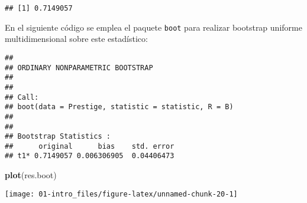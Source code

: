 \documentclass[]{book}
\newenvironment{Shaded}{\begin{snugshade}}{\end{snugshade}}
\newcommand{\KeywordTok}[1]{\textcolor[rgb]{0.13,0.29,0.53}{\textbf{#1}}}
\newcommand{\DataTypeTok}[1]{\textcolor[rgb]{0.13,0.29,0.53}{#1}}
\newcommand{\DecValTok}[1]{\textcolor[rgb]{0.00,0.00,0.81}{#1}}
\newcommand{\StringTok}[1]{\textcolor[rgb]{0.31,0.60,0.02}{#1}}
\newcommand{\CommentTok}[1]{\textcolor[rgb]{0.56,0.35,0.01}{\textit{#1}}}
\newcommand{\ControlFlowTok}[1]{\textcolor[rgb]{0.13,0.29,0.53}{\textbf{#1}}}
\newcommand{\OperatorTok}[1]{\textcolor[rgb]{0.81,0.36,0.00}{\textbf{#1}}}
\newcommand{\NormalTok}[1]{#1}
\theoremstyle{break}
\theoremstyle{definition}
\theoremstyle{definition}
\theoremstyle{definition}
\theoremstyle{remark}
\begin{document}
\begin{Shaded}
\end{Shaded}

\begin{verbatim}
## [1] 0.7149057
\end{verbatim}

En el siguiente código se emplea el paquete \texttt{boot} para realizar
bootstrap uniforme multidimensional sobre este estadístico:

\begin{Shaded}
\end{Shaded}

\begin{verbatim}
## 
## ORDINARY NONPARAMETRIC BOOTSTRAP
## 
## 
## Call:
## boot(data = Prestige, statistic = statistic, R = B)
## 
## 
## Bootstrap Statistics :
##      original      bias    std. error
## t1* 0.7149057 0.006306905  0.04406473
\end{verbatim}

\begin{Shaded}
\begin{Highlighting}[]
\KeywordTok{plot}\NormalTok{(res.boot)}
\end{Highlighting}
\end{Shaded}

\begin{center}\texttt{[image: 01-intro\_files/figure-latex/unnamed-chunk-20-1]} \end{center}
\end{document}
